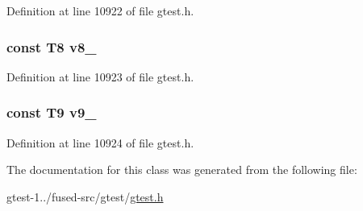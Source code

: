 \-Definition at line 10922 of file gtest.\-h.

\hypertarget{classtesting_1_1internal_1_1ValueArray12_a596bc5260b2474271d1f6910ff6f665d}{
\subsubsection[{v8\-\_\-}]{\setlength{\rightskip}{0pt plus 5cm}const \-T8 {\bf v8\-\_\-}}}\label{d9/d08/classtesting_1_1internal_1_1ValueArray12_a596bc5260b2474271d1f6910ff6f665d}


\-Definition at line 10923 of file gtest.\-h.

\hypertarget{classtesting_1_1internal_1_1ValueArray12_a6356e16cf54a9dfac8525f20242af31e}{
\subsubsection[{v9\-\_\-}]{\setlength{\rightskip}{0pt plus 5cm}const \-T9 {\bf v9\-\_\-}}}\label{d9/d08/classtesting_1_1internal_1_1ValueArray12_a6356e16cf54a9dfac8525f20242af31e}


\-Definition at line 10924 of file gtest.\-h.



\-The documentation for this class was generated from the following file\-:\begin{DoxyCompactItemize}
\item 
gtest-\/1../fused-\/src/gtest/\hyperlink{fused-src_2gtest_2gtest_8h}{gtest.\-h}\end{DoxyCompactItemize}
